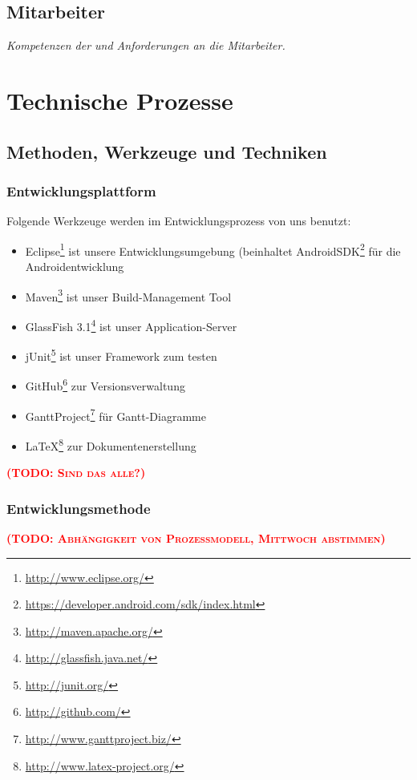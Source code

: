 \documentclass[fontsize=12pt,paper=a4,twoside]{scrartcl}
\newcommand{\todo}[1]{\textbf{\textsc{\textcolor{red}{(TODO: #1)}}}}
\begin{document}
\subsection{Mitarbeiter}
{\em Kompetenzen der und Anforderungen an die Mitarbeiter.}


\section{Technische Prozesse}
\subsection{Methoden, Werkzeuge und Techniken}
\subsubsection{Entwicklungsplattform}
Folgende Werkzeuge werden im Entwicklungsprozess von uns benutzt:
\begin{itemize}

\item{Eclipse\footnote{\url{http://www.eclipse.org/}} ist unsere Entwicklungsumgebung (beinhaltet AndroidSDK\footnote{\url{https://developer.android.com/sdk/index.html}} für die Androidentwicklung}
\item{Maven\footnote{\url{http://maven.apache.org/}} ist unser Build-Management Tool}
\item{GlassFish 3.1\footnote{\url{http://glassfish.java.net/}} ist unser Application-Server}
\item{jUnit\footnote{\url{http://junit.org/}} ist unser Framework zum testen}
\item{GitHub\footnote{\url{http://github.com/}} zur Versionsverwaltung}
\item{GanttProject\footnote{\url{http://www.ganttproject.biz/}}} für Gantt-Diagramme
\item{\LaTeX{}\footnote{\url{http://www.latex-project.org/}}} zur Dokumentenerstellung

\end{itemize}
\todo{Sind das alle?}

\subsubsection{Entwicklungsmethode}

\todo{Abhängigkeit von Prozessmodell, Mittwoch abstimmen}
\end{document}

